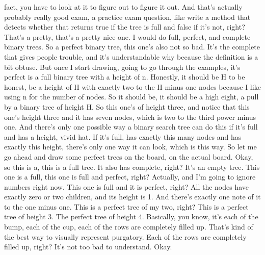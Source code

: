 fact, you have to look at it to figure out to figure it out. And that's actually probably really good exam, a practice exam question, like write a method that detects whether that returns true if the tree is full and false if it's not, right? That's a pretty, that's a pretty nice one. I would do full, perfect, and complete binary trees. So a perfect binary tree, this one's also not so bad. It's the complete that gives people trouble, and it's understandable why because the definition is a bit obtuse. But once I start drawing, going to go through the examples, it's perfect is a full binary tree with a height of n. Honestly, it should be H to be honest, be a height of H with exactly two to the H minus one nodes because I like using n for the number of nodes. So it should be, it should be a high eight, a pull by a binary tree of height H. So this one's of height three, and notice that this one's height three and it has seven nodes, which is two to the third power minus one. And there's only one possible way a binary search tree can do this if it's full and has a height, vivid hat. If it's full, has exactly this many nodes and has exactly this height, there's only one way it can look, which is this way. So let me go ahead and draw some perfect trees on the board, on the actual board. Okay, so this is a, this is a full tree. It also has complete, right? It's an empty tree. This one is a full, this one is full and perfect, right? Actually, and I'm going to ignore numbers right now. This one is full and it is perfect, right? All the nodes have exactly zero or two children, and its height is 1. And there's exactly one note of it to the one minus one. This is a perfect tree of my two, right? This is a perfect tree of height 3. The perfect tree of height 4. Basically, you know, it's each of the bump, each of the cup, each of the rows are completely filled up. That's kind of the best way to visually represent purgatory. Each of the rows are completely filled up, right? It's not too bad to understand. Okay.

